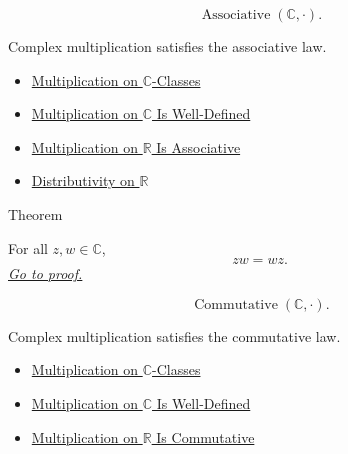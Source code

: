 
\begin{remark*}
\[
\operatorname{Associative}(\mathbb{C},\cdot).
\]
\end{remark*}

\begin{remark*}[Interpretation]
Complex multiplication satisfies the associative law.
\end{remark*}

\begin{dependencies}
\begin{itemize}
  \item \hyperref[def:multiplication-on-c-classes]{Multiplication on $\mathbb{C}$-Classes}
  \item \hyperref[thm:multiplication-on-c-well-defined]{Multiplication on $\mathbb{C}$ Is Well-Defined}
  \item \hyperref[thm:multiplication-on-r-associative]{Multiplication on $\mathbb{R}$ Is Associative}
  \item \hyperref[thm:distributivity-on-r]{Distributivity on $\mathbb{R}$}
\end{itemize}
\end{dependencies}

\begin{theorembox}{Theorem}
\begin{theorem}
\label{thm:multiplication-on-c-commutative}
For all \(z,w\in\mathbb{C}\),
\[
zw=wz.
\]
\hyperref[prf:multiplication-on-c-commutative]{\textit{Go to proof.}}
\end{theorem}
\end{theorembox}


\begin{remark*}
\[
\operatorname{Commutative}(\mathbb{C},\cdot).
\]
\end{remark*}

\begin{remark*}[Interpretation]
Complex multiplication satisfies the commutative law.
\end{remark*}

\begin{dependencies}
\begin{itemize}
  \item \hyperref[def:multiplication-on-c-classes]{Multiplication on $\mathbb{C}$-Classes}
  \item \hyperref[thm:multiplication-on-c-well-defined]{Multiplication on $\mathbb{C}$ Is Well-Defined}
  \item \hyperref[thm:multiplication-on-r-commutative]{Multiplication on $\mathbb{R}$ Is Commutative}
\end{itemize}
\end{dependencies}

